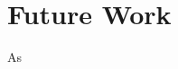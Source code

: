 \documentclass[11pt]{report}
\begin{document}
	\section{Future Work}
	
	\par  As 

\newpage
	
{}
%
	
\end{document}
